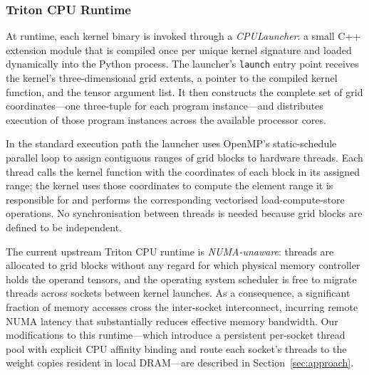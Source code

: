 \documentclass[conference]{IEEEtran}
\begin{document}
\subsubsection{Triton CPU Runtime}
\label{sec:bg_triton_rt}

At runtime, each kernel binary is invoked through a
\emph{CPULauncher}: a small C++ extension module that is compiled once
per unique kernel signature and loaded dynamically into the Python
process.  The launcher's \texttt{launch} entry point receives the
kernel's three-dimensional grid extents, a pointer to the compiled
kernel function, and the tensor argument list.  It then constructs the
complete set of grid coordinates—one three-tuple for each program
instance—and distributes execution of those program instances across the
available processor cores.

In the standard execution path the launcher uses OpenMP's static-schedule
parallel loop to assign contiguous ranges of grid blocks to hardware
threads.  Each thread calls the kernel function with the coordinates of
each block in its assigned range; the kernel uses those coordinates to
compute the element range it is responsible for and performs the
corresponding vectorised load-compute-store operations.  No
synchronisation between threads is needed because grid blocks are
defined to be independent.

The current upstream Triton CPU runtime is \emph{NUMA-unaware}: threads
are allocated to grid blocks without any regard for which physical
memory controller holds the operand tensors, and the operating system
scheduler is free to migrate threads across sockets between kernel
launches.  As a consequence, a significant fraction of memory accesses
cross the inter-socket interconnect, incurring remote NUMA latency that
substantially reduces effective memory bandwidth.  Our modifications to
this runtime—which introduce a persistent per-socket thread pool with
explicit CPU affinity binding and route each socket's threads to the
weight copies resident in local DRAM—are described in
Section~\ref{sec:approach}.


\end{document}
